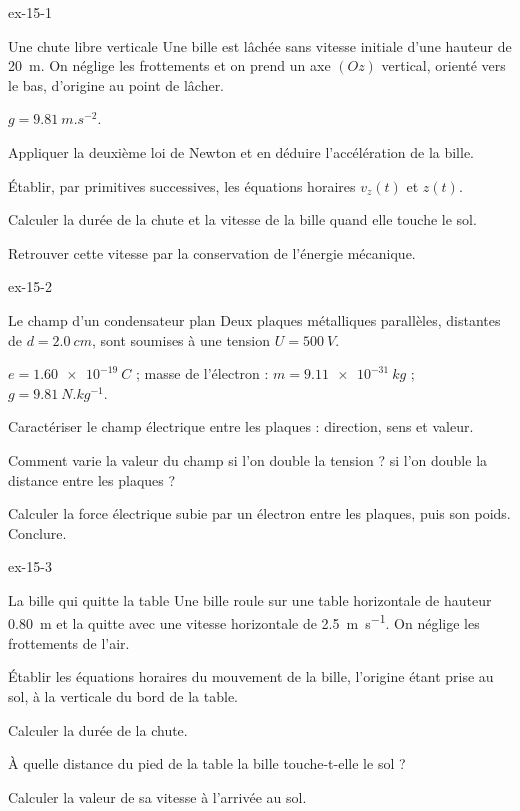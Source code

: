 \begin{blocLivre}{ex-15-1}
\begin{exercice}[1]{Une chute libre verticale}
Une bille est lâchée sans vitesse initiale d'une hauteur de 20~m. On néglige les frottements et on prend un axe $(Oz)$
vertical, orienté vers le bas, d'origine au point de lâcher.
\begin{donnees}
$g=\qty{9,81}{m.s^{-2}}$.
\end{donnees}
\begin{questions}
\item Appliquer la deuxième loi de Newton et en déduire l'accélération de la bille.
\item Établir, par primitives successives, les équations horaires $v_z(t)$ et $z(t)$.
\item Calculer la durée de la chute et la vitesse de la bille quand elle touche le sol.
\item Retrouver cette vitesse par la conservation de l'énergie mécanique.
\end{questions}
\end{exercice}
\end{blocLivre}
\begin{blocLivre}{ex-15-2}
\begin{exercice}[1]{Le champ d'un condensateur plan}
Deux plaques métalliques parallèles, distantes de $d=\qty{2,0}{cm}$, sont soumises à une tension $U=\qty{500}{V}$.
\begin{donnees}
$e=\qty{1,60e-19}{C}$ ; masse de l'électron : $m=\qty{9,11e-31}{kg}$ ; $g=\qty{9,81}{N.kg^{-1}}$.
\end{donnees}
\begin{questions}
\item Caractériser le champ électrique entre les plaques : direction, sens et valeur.
\item Comment varie la valeur du champ si l'on double la tension ? si l'on double la distance entre les plaques ?
\item Calculer la force électrique subie par un électron entre les plaques, puis son poids. Conclure.
\end{questions}
\end{exercice}
\end{blocLivre}
\begin{blocLivre}{ex-15-3}
\begin{exercice}[1]{La bille qui quitte la table}
Une bille roule sur une table horizontale de hauteur \qty{0,80}{m} et la quitte avec une vitesse horizontale de
\qty{2,5}{m.s^{-1}}. On néglige les frottements de l'air.
\begin{questions}
\item Établir les équations horaires du mouvement de la bille, l'origine étant prise au sol, à la verticale du bord de la
table.
\item Calculer la durée de la chute.
\item À quelle distance du pied de la table la bille touche-t-elle le sol ?
\item Calculer la valeur de sa vitesse à l'arrivée au sol.
\end{questions}
\end{exercice}
\end{blocLivre}
